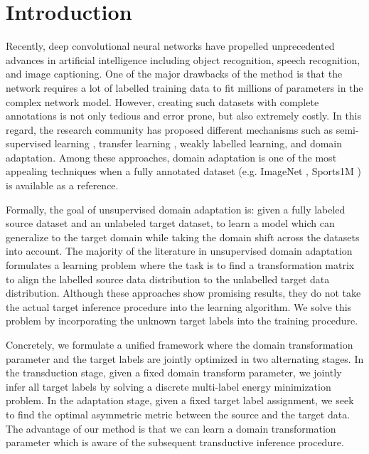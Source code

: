 \documentclass{article}
\begin{document}
\section{Introduction}
\label{intro}
Recently, deep convolutional neural networks \cite{alexnet, vggnet, googlenet} have propelled unprecedented advances in artificial intelligence including object recognition, speech recognition, and image captioning. One of the major drawbacks of the method is that the network requires a lot of labelled training data to fit millions of parameters in the complex network model. However, creating such datasets with complete annotations is not only tedious and error prone, but also extremely costly. In this regard, the research community has proposed different mechanisms such as semi-supervised learning \cite{semisup1,semisup2,semisup3}, transfer learning \cite{transfer1, transfer2}, weakly labelled learning, and domain adaptation. Among these approaches, domain adaptation is one of the most appealing techniques when a fully annotated dataset (e.g. ImageNet \cite{ImageNet}, Sports1M \cite{sports1m}) is available as a reference. 

Formally, the goal of unsupervised domain adaptation is: given a fully labeled source dataset and an unlabeled target dataset, to learn a model which can generalize to the target domain while taking the domain shift across the datasets into account. The majority of the literature \cite{gong12, baochen15, fernando13, baochen16, tommasi13} in unsupervised domain adaptation formulates a learning problem where the task is to find a transformation matrix to align the labelled source data distribution to the unlabelled target data distribution. Although these approaches show promising results, they do not take the actual target inference procedure into the learning algorithm. We solve this problem by incorporating the unknown target labels into the training procedure.

Concretely, we formulate a unified framework where the domain transformation parameter and the target labels are jointly optimized in two alternating stages. In the transduction stage, given a fixed domain transform parameter, we jointly infer all target labels by solving a discrete multi-label energy minimization problem. In the adaptation stage, given a fixed target label assignment, we seek to find the optimal asymmetric metric  between the source and the target data. The advantage of our method is that we can learn a domain transformation parameter which is aware of the subsequent transductive inference procedure. 
\end{document}
